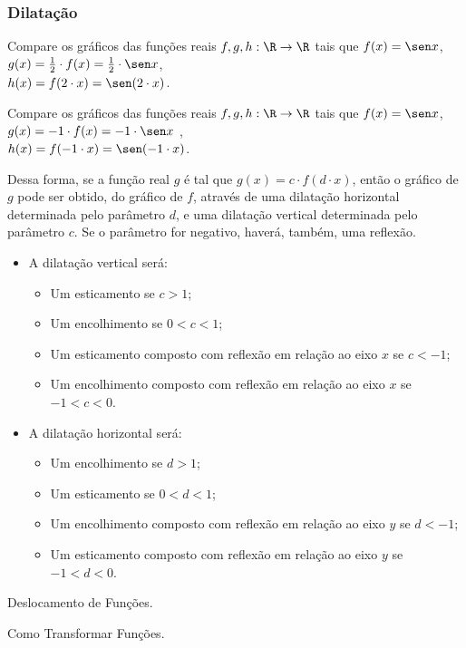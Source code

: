 \subsubsection{Dilatação}

\begin{example}
Compare os gráficos das funções reais $f, g , h: \R \to \R$ tais que
$f(x) = \sen x$, \\ $g(x) = \frac 1 2 \cdot f(x)  = \frac 1 2 \cdot \sen x $, \\
$h(x)= f(2 \cdot x)= \sen (2 \cdot x)$.
\end{example}

\begin{example}
Compare os gráficos das funções reais $f, g , h: \R \to \R$ tais que
$f(x) = \sen x$, \\ $g(x) = -1 \cdot f(x)  = -1 \cdot \sen x $ , \\
$h(x)= f(-1 \cdot x)= \sen (-1 \cdot x)$.
\end{example}

Dessa forma, se a função real $g$ é tal que $g(x) = c \cdot f(d
\cdot x)$, então o gráfico de $g$ pode ser obtido, do gráfico de
$f$, através de uma dilatação horizontal determinada pelo parâmetro
$d$, e uma dilatação vertical determinada pelo parâmetro $c$. Se o
parâmetro for negativo, haverá, também, uma reflexão.
\begin{itemize}
  \item A dilatação vertical será:
        \begin{itemize}
          \item Um esticamento se $c>1$;
          \item Um encolhimento se $0<c<1$;
          \item Um esticamento composto com reflexão em relação ao eixo $x$ se $c<-1$;
          \item Um encolhimento composto com reflexão em relação ao eixo $x$ se
          $-1<c<0$.
        \end{itemize}
  \item A dilatação horizontal será:
        \begin{itemize}
          \item Um encolhimento se $d>1$;
          \item Um esticamento se $0<d<1$;
          \item Um encolhimento composto com reflexão em relação ao eixo $y$ se $d<-1$;
          \item Um esticamento composto com reflexão em relação ao eixo $y$ se
          $-1<d<0$.
        \end{itemize}
\end{itemize}

\begin{onlineact}
    {Deslocamento de Funções}.
\end{onlineact}

\begin{onlineact}
    {Como Transformar Funções}.
\end{onlineact}